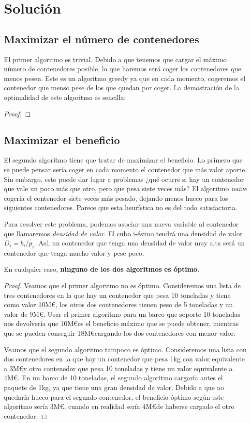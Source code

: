 \documentclass[a4paper, 11pt]{article}
\begin{document}
\section{Solución}
\subsection{Maximizar el número de contenedores}
El primer algoritmo es trivial. Debido a que tenemos que cargar el máximo número de contenedores posible, lo que haremos será coger los contenedores que menos pesen. Este es un algoritmo greedy ya que en cada momento, cogeremos el contenedor que menso pese de los que quedan por coger. La demostración de la optimalidad de este algoritmo es sencilla:
\begin{proof}

\end{proof}

\subsection{Maximizar el beneficio}
El segundo algoritmo tiene que tratar de maximizar el beneficio. Lo primero que se puede pensar sería coger en cada momento el contenedor que más valor aporte. Sin embargo, esto puede dar lugar a problemas ¿qué ocurre si hay un contenedor que vale un poco más que otro, pero que pesa siete veces más? El algoritmo \textit{naive} cogería el contenedor siete veces más pesado, dejando menos hueco para los siguientes contenedores. Parece que esta heurística no es del todo satisfactoria.

Para resolver este problema, podemos asociar una nueva variable al contenedor que llamaremos \textit{densidad de valor}. El cubo i-ésimo tendrá una densidad de valor $D_i = b_i/p_i$. Así, un contenedor que tenga una densidad de valor muy alta será un contenedor que tenga mucho valor y pese poco.

En cualquier caso, \textbf{ninguno de los dos algoritmos es óptimo}.

\begin{proof}
Veamos que el primer algoritmo no es óptimo. Consideremos una lista de tres contenedores en la que hay un contenedor que pesa 10 toneladas y tiene como valor 10M\euro, los otros dos contenedores tienen peso de 5 toneladas y un valor de 9M\euro. Usar el primer algoritmo para un barco que soporte 10 toneladas nos devolvería que 10M\euro es el beneficio máximo que se puede obtener, mientras que se pueden conseguir 18M\euro cargando los dos contenedores con menor valor.

Veamos que el segundo algoritmo tampoco es óptimo. Consideremos una lista con dos contenedores en la que hay un contenedor que pesa 1kg con valor equivalente a 3M\euro  y otro contenedor que pesa 10 toneladas y tiene un valor equivalente a 4M\euro. En un barco de 10 toneladas, el segundo algoritmo cargaría antes el paquete de 1kg, ya que tiene una gran densidad de valor. Debido a que no quedaría hueco para el segundo contenedor, el beneficio óptimo según este algoritmo sería 3M\euro, cuando en realidad sería 4M\euro de haberse cargado el otro contenedor.

\end{proof}
\end{document}
